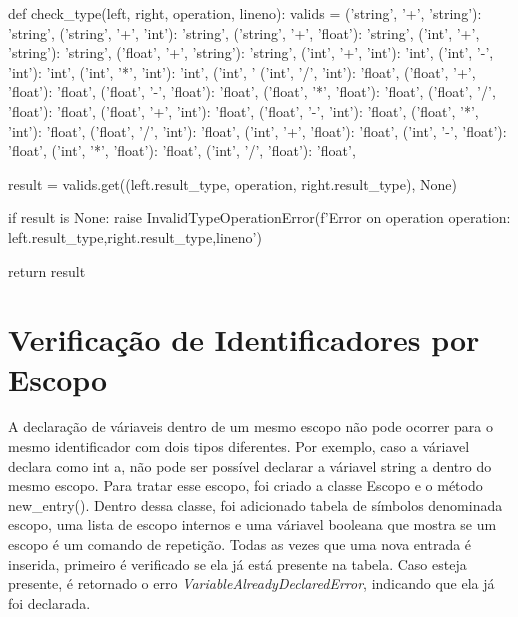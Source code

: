 \documentclass[
	12pt,				%
	openright,			%
	twoside,			%
	a4paper,			%
	english,			%
	french,				%
	spanish,			%
	brazil				%
	]{abntex2}
\begin{document}
\begin{python}
    
def check_type(left, right, operation, lineno):
    valids = {
        ('string', '+', 'string'): 'string',
        ('string', '+', 'int'): 'string',
        ('string', '+', 'float'): 'string',
        ('int', '+', 'string'): 'string',
        ('float', '+', 'string'): 'string',
        ('int', '+', 'int'): 'int',
        ('int', '-', 'int'): 'int',
        ('int', '*', 'int'): 'int',
        ('int', '%
        ('int', '/', 'int'): 'float',
        ('float', '+', 'float'): 'float',
        ('float', '-', 'float'): 'float',
        ('float', '*', 'float'): 'float',
        ('float', '/', 'float'): 'float',
        ('float', '+', 'int'): 'float',
        ('float', '-', 'int'): 'float',
        ('float', '*', 'int'): 'float',
        ('float', '/', 'int'): 'float',
        ('int', '+', 'float'): 'float',
        ('int', '-', 'float'): 'float',
        ('int', '*', 'float'): 'float',
        ('int', '/', 'float'): 'float',
    }
 
    result = valids.get((left.result_type, operation, right.result_type), None)
 
    if result is None:
        raise InvalidTypeOperationError(f'Error on operation {operation}: {left.result_type},{right.result_type},{lineno}')
 
    return result

\end{python}
\section{Verificação de Identificadores por Escopo}
A declaração de váriaveis dentro de um mesmo escopo não pode ocorrer para o mesmo
identificador com dois tipos diferentes. Por exemplo, caso a váriavel declara como int a,
não pode ser possível declarar a váriavel string a dentro do mesmo escopo.
Para tratar esse escopo, foi criado a classe Escopo e o método new\_entry().
Dentro dessa classe, foi adicionado tabela de símbolos denominada escopo, uma lista de escopo
internos e uma váriavel booleana que mostra se um escopo é um comando de repetição.
Todas as vezes que uma nova entrada é inserida, primeiro é verificado se ela já está presente na tabela.
Caso esteja presente, é retornado o
erro \emph{VariableAlreadyDeclaredError}, indicando que ela já foi declarada. 
\end{document}
